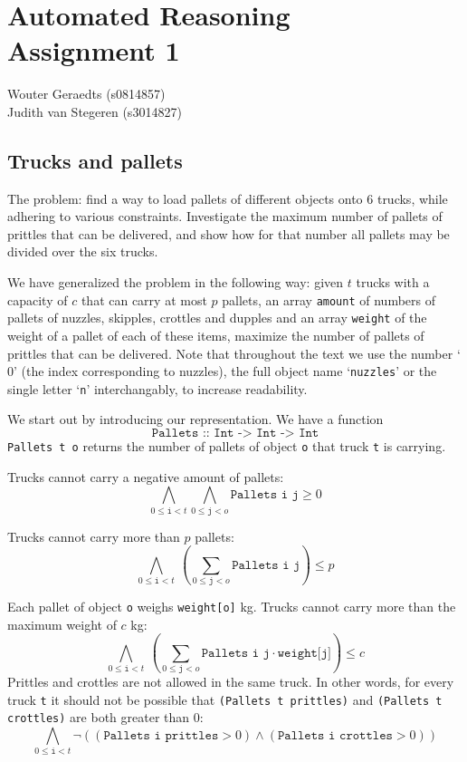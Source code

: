 \documentclass[12pt]{article}
\begin{document}
\section*{Automated Reasoning\\Assignment 1}

\begin{center}
Wouter Geraedts (s0814857) \\
Judith van Stegeren (s3014827)\\
\end{center}

\vspace{8mm}

\subsection*{Trucks and pallets}
The problem: find a way to load pallets of different objects onto 6 trucks, while adhering to various constraints. 
Investigate the maximum number of pallets of prittles that can be delivered, 
and show how for that number all pallets may be divided over the six trucks.

We have generalized the problem in the following way: given $t$ trucks with a capacity of $c$ that can carry at most $p$ pallets, an array \texttt{amount} of numbers of pallets of nuzzles, skipples, crottles and dupples and an array \texttt{weight} of the weight of a pallet of each of these items, maximize the number of pallets of prittles that can be delivered.
Note that throughout the text we use the number `$0$' (the index corresponding to nuzzles), the full object name `\texttt{nuzzles}' or the single letter `\texttt{n}' interchangably, to increase readability.

We start out by introducing our representation. We have a function 
\[\texttt{Pallets :: Int -> Int -> Int}\]
\texttt{Pallets t o} returns the number of pallets of object \texttt{o} that truck \texttt{t} is carrying.

Trucks cannot carry a negative amount of pallets:
\[ \bigwedge_{0 \le \texttt{i} < t} \bigwedge_{0 \le \texttt{j} < o} \texttt{Pallets i j} \ge 0 \]

Trucks cannot carry more than $p$ pallets:
\[ \bigwedge_{0 \le \texttt{i} < t} ~ ( \sum_{0 \le \texttt{j} < o} \texttt{Pallets i j} ) \le p \]

Each pallet of object \texttt{o} weighs \texttt{weight[o]} kg. Trucks cannot carry more than the maximum weight of $c$ kg:
\[ \bigwedge_{0 \le \texttt{i} < t} ~ (\sum_{0 \le \texttt{j} < o} \texttt{Pallets i j} \cdot \texttt{weight[j]}) \le c \]
Prittles and crottles are not allowed in the same truck. In other words, for every truck \texttt{t} it should not be possible that \texttt{(Pallets t prittles)} and \texttt{(Pallets t crottles)} are both greater than 0:
\[ \bigwedge_{0 \le \texttt{i} < t} \neg \left(( \texttt{Pallets i prittles} > 0) \wedge (\texttt{Pallets i crottles} > 0 )\right)\]
\end{document}
